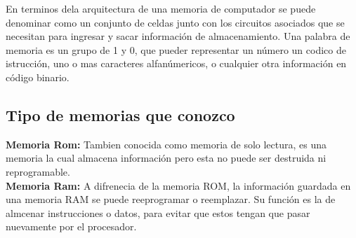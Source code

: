 \documentclass{article}
\begin{document}
En terminos dela arquitectura de una memoria de computador se puede denominar como un conjunto de celdas junto con los circuitos asociados que se necesitan para ingresar y sacar información de almacenamiento. Una palabra de memoria es un grupo de 1 y 0, que pueder representar un número un codico de istrucción, uno o mas caracteres alfanúmericos, o cualquier otra información en código binario. \cite{ingenieu} \\

\subsection{Tipo de memorias que conozco}
\textbf{Memoria Rom:} Tambien conocida como memoria de solo lectura, es una memoria la cual almacena información pero esta no puede ser destruida ni reprogramable. \\

\textbf{Memoria Ram:} A difrenecia de la memoria ROM, la información guardada en una memoria RAM se puede reeprogramar o reemplazar. Su función es la de almcenar instrucciones o datos, para evitar que estos tengan que pasar nuevamente por el procesador. \\
\end{document}

